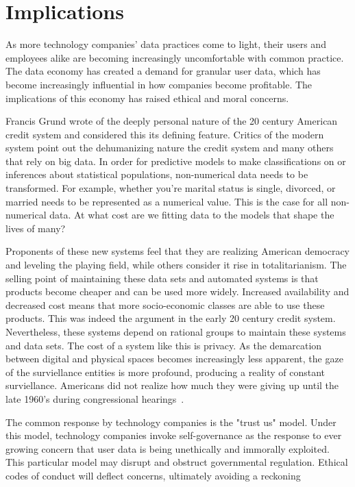 \section{Implications}

As more technology companies' data practices come to light, their users and
employees alike are becoming increasingly uncomfortable with common practice.
The data economy has created a demand for granular user data, which has become
increasingly influential in how companies become profitable. The implications
of this economy has raised ethical and moral concerns.


Francis Grund wrote of the deeply personal nature of the 20 century American
credit system and considered this its defining feature. Critics of the modern
system point out the dehumanizing nature the credit system and many others that rely on
big data. In order for predictive models to make classifications on or inferences
about statistical populations, non-numerical data needs to be transformed. For example,
whether you're marital status is single, divorced, or married needs to be represented
as a numerical value. This is the case for all non-numerical data. At what cost are
we fitting data to the models that shape the lives of many?

Proponents of these new systems feel that they are realizing American democracy
and leveling the playing field, while others consider it rise in
totalitarianism. The selling point of maintaining these data sets and
automated systems is that products become cheaper and can be used more widely.
Increased availability and decreased cost means that more socio-economic
classes are able to use these products. This was indeed the argument in the
early 20 century credit system. Nevertheless, these systems depend on
rational groups to maintain these systems and data sets. The cost of a system
like this is privacy. As the demarcation between digital and physical spaces
becomes increasingly less apparent, the gaze of the surviellance entities is
more profound, producing a reality of constant surviellance. Americans did not
realize how much they were giving up until the late 1960's during congressional
hearings~\cite{lauer2017creditworthy}.

The common response by technology companies is the "trust us" model. Under this
model, technology companies invoke self-governance as the response to ever
growing concern that user data is being unethically and immorally exploited.
This particular model may disrupt and obstruct governmental regulation. Ethical
codes of conduct will deflect concerns, ultimately avoiding a reckoning~\cite{whittaker2018ai}

